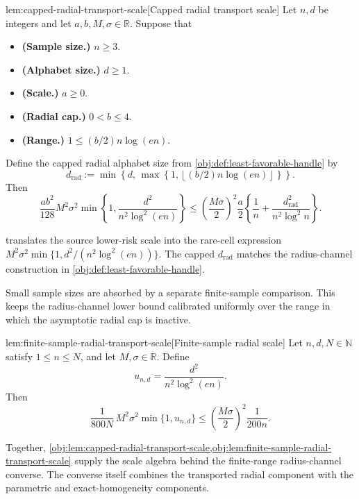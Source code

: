 \begin{lemmav}{lem:capped-radial-transport-scale}[Capped radial transport scale]
Let \(n,d\) be integers and let \(a,b,M,\sigma\in\mathbb R\).  Suppose that
\begin{itemize}
\item \textbf{(Sample size.)} \(n\ge 3\).
\item \textbf{(Alphabet size.)} \(d\ge 1\).
\item \textbf{(Scale.)} \(a\ge 0\).
\item \textbf{(Radial cap.)} \(0<b\le 4\).
\item \textbf{(Range.)} \(1\le (b/2)n\log(en)\).
\end{itemize}
Define the capped radial alphabet size from \cref{obj:def:least-favorable-handle} by
\[
d_{\mathrm{rad}}
:=
\min\left\{
d,\,
\max\left\{1,\left\lfloor (b/2)n\log(en)\right\rfloor\right\}
\right\}.
\]
Then
\[
\frac{ab^2}{128}M^2\sigma^2
\min\left\{1,\frac{d^2}{n^2\log^2(en)}\right\}
\le
\left(\frac{M\sigma}{2}\right)^2
\frac a2
\left\{
\frac1n+
\frac{d_{\mathrm{rad}}^2}{n^2\log^2 n}
\right\}.
\]
\end{lemmav}

 translates the source lower-risk scale into the rare-cell expression \(M^2\sigma^2\min\{1,d^2/(n^2\log^2(en))\}\). The capped \(d_{\mathrm{rad}}\) matches the radius-channel construction in \cref{obj:def:least-favorable-handle}.

Small sample sizes are absorbed by a separate finite-sample comparison. This keeps the radius-channel lower bound calibrated uniformly over the range in which the asymptotic radial cap is inactive.

\begin{lemmav}{lem:finite-sample-radial-transport-scale}[Finite-sample radial scale]
Let \(n,d,N\in\mathbb N\) satisfy \(1\le n\le N\), and let \(M,\sigma\in\mathbb R\).  Define
\[
u_{n,d}=\frac{d^2}{n^2\log^2(en)}.
\]
Then
\[
\frac{1}{800N}\,M^2\sigma^2\min\{1,u_{n,d}\}
\le
\left(\frac{M\sigma}{2}\right)^2\frac{1}{200n}.
\]
\end{lemmav}

Together, \cref{obj:lem:capped-radial-transport-scale,obj:lem:finite-sample-radial-transport-scale} supply the scale algebra behind the finite-range radius-channel converse. The converse itself combines the transported radial component with the parametric and exact-homogeneity components.

